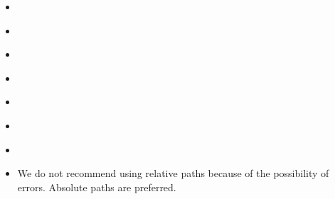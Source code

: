 \documentclass[a4paper,10pt,english,openany]{sphinxmanual}
\begin{document}
\begin{sphinxShadowBox}
\begin{itemize}
\item {} 
\label{\detokenize{tutorials/S6_Conver_FM:id1}}{\hyperref[\detokenize{tutorials/S6_Conver_FM:the-installation}]{}}

\item {} 
\label{\detokenize{tutorials/S6_Conver_FM:id2}}{\hyperref[\detokenize{tutorials/S6_Conver_FM:str-dip-rake-to-mt}]{}}

\item {} 
\label{\detokenize{tutorials/S6_Conver_FM:id3}}{\hyperref[\detokenize{tutorials/S6_Conver_FM:the-conversion-between-str-dip-rake-and-a-n-vector}]{}}

\item {} 
\label{\detokenize{tutorials/S6_Conver_FM:id4}}{\hyperref[\detokenize{tutorials/S6_Conver_FM:the-conversion-between-a-n-vector-and-p-t-n-vector}]{}}

\item {} 
\label{\detokenize{tutorials/S6_Conver_FM:id5}}{\hyperref[\detokenize{tutorials/S6_Conver_FM:mt-to-p-t-n-vector}]{}}

\item {} 
\label{\detokenize{tutorials/S6_Conver_FM:id6}}{\hyperref[\detokenize{tutorials/S6_Conver_FM:p-t-n-vector-to-p-t-n-vector-s-stirke-and-dip}]{}}

\item {} 
\label{\detokenize{tutorials/S6_Conver_FM:id7}}{\hyperref[\detokenize{tutorials/S6_Conver_FM:describe-fault-plane-with-two-str-dip-rake}]{}}

\end{itemize}
\end{sphinxShadowBox}
\begin{itemize}
\item {} 
We do not recommend using relative paths because of the possibility of errors. Absolute paths are preferred.

\end{itemize}
\end{document}
